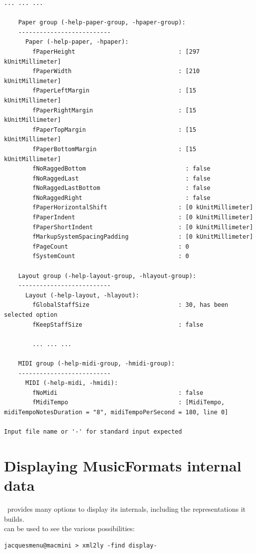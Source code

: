 \begin{lstlisting}[language=Terminal]
		... ... ...

    Paper group (-help-paper-group, -hpaper-group):
    --------------------------
      Paper (-help-paper, -hpaper):
        fPaperHeight                             : [297 kUnitMillimeter]
        fPaperWidth                              : [210 kUnitMillimeter]
        fPaperLeftMargin                         : [15 kUnitMillimeter]
        fPaperRightMargin                        : [15 kUnitMillimeter]
        fPaperTopMargin                          : [15 kUnitMillimeter]
        fPaperBottomMargin                       : [15 kUnitMillimeter]
        fNoRaggedBottom                            : false
        fNoRaggedLast                              : false
        fNoRaggedLastBottom                        : false
        fNoRaggedRight                             : false
        fPaperHorizontalShift                    : [0 kUnitMillimeter]
        fPaperIndent                             : [0 kUnitMillimeter]
        fPaperShortIndent                        : [0 kUnitMillimeter]
        fMarkupSystemSpacingPadding              : [0 kUnitMillimeter]
        fPageCount                               : 0
        fSystemCount                             : 0

    Layout group (-help-layout-group, -hlayout-group):
    --------------------------
      Layout (-help-layout, -hlayout):
        fGlobalStaffSize                         : 30, has been selected option
        fKeepStaffSize                           : false

		... ... ...

    MIDI group (-help-midi-group, -hmidi-group):
    --------------------------
      MIDI (-help-midi, -hmidi):
        fNoMidi                                  : false
        fMidiTempo                               : [MidiTempo, midiTempoNotesDuration = "8", midiTempoPerSecond = 180, line 0]

Input file name or '-' for standard input expected
\end{lstlisting}


\section{Displaying MusicFormats internal data}\label{Displaying MusicFormats internal data}

\mf\ provides many options to display its internals, including the representations it builds. \\
 can be used to see the various possibilities:
\begin{lstlisting}[language=Terminal]
jacquesmenu@macmini > xml2ly -find display-
\end{lstlisting}

